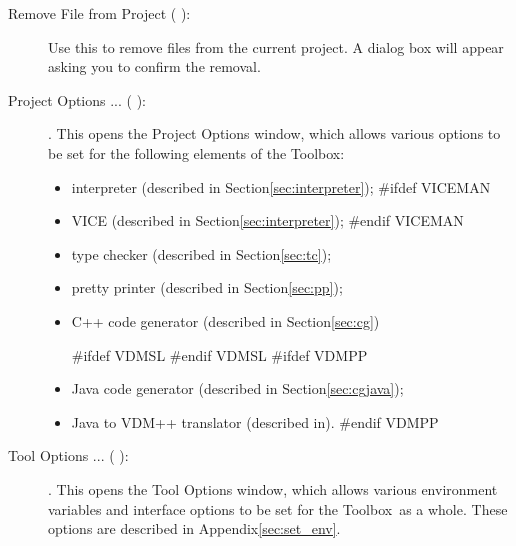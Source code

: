 \documentclass[\pformat,12pt]{article}
\newcommand{\Toolbox}{Toolbox}
\newcommand{\Toolbox}{Toolbox}
\newcommand{\guicmd}[1]{{\sf #1}}
\newcommand{\guicmd}[1]{{\gt #1}}
\begin{document}
\begin{description}
\item[\guicmd{Remove File from Project} (\hspace{-1.5mm}
 ):]
 Use this to remove files from
 the current project. A dialog box will appear asking you to confirm
 the removal. 

\item[\guicmd{Project Options ...} (\hspace{-1.5mm}
):].
  This opens the \guicmd{Project Options} window, which allows various options
  to be set for the following elements of the \Toolbox:
  \begin{itemize}
    \item \guicmd{interpreter} (described in
  Section\ref{sec:interpreter});
#ifdef VICEMAN
    \item \guicmd{VICE} (described in
  Section\ref{sec:interpreter});
#endif VICEMAN
    \item \guicmd{type checker}  (described in Section\ref{sec:tc});
    \item \guicmd{pretty printer}  (described in Section\ref{sec:pp});
    \item \guicmd{C++ code generator} (described in Section\ref{sec:cg})%

#ifdef VDMSL
#endif VDMSL
#ifdef VDMPP
    \item \guicmd{Java code generator}  (described in Section\ref{sec:cgjava});
    \item \guicmd{Java to VDM++ translator}  (described in\cite{Java2VDMMan-CSK}). 
#endif VDMPP
  \end{itemize}

\item[\guicmd{Tool Options ...} (\hspace{-1.5mm}
):].
  This opens the \guicmd{Tool Options} window, which allows various
  environment variables and interface options to be set for the
  \Toolbox\ as a whole. These options are described in
  Appendix\ref{sec:set_env}. 


\end{description}
\end{document}
